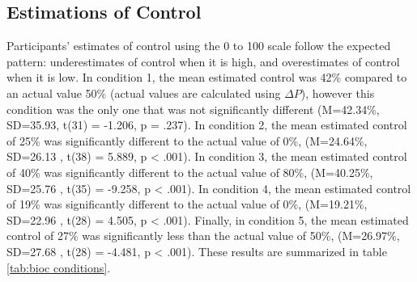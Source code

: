 \documentclass[USenglish,letterpaper,12pt,extrafontsizes,oneside,onecolumn,final]{memoir}
\begin{document}
\subsection{Estimations of Control}

Participants' estimates of control using the 0 to 100 scale follow the expected pattern: underestimates of control when it is high, and overestimates of control when it is low.  In condition 1, the mean estimated control was 42\% compared to an actual value 50\% (actual values are calculated using $\Delta P$), however this condition was the only one that was not significantly different (M=42.34\%, SD=35.93, t(31) = -1.206, p = .237).  In condition 2, the mean estimated control of 25\% was significantly different to the actual value of 0\%, (M=24.64\%, SD=26.13 , t(38) = 5.889, p < .001). In condition 3, the mean estimated control of 40\% was significantly different to the actual value of 80\%, (M=40.25\%, SD=25.76 , t(35) = -9.258, p < .001). In condition 4, the mean estimated control of 19\% was significantly different to the actual value of 0\%, (M=19.21\%, SD=22.96 , t(28) = 4.505, p < .001).  Finally, in condition 5, the mean estimated control of 27\% was significantly less than the actual value of 50\%, (M=26.97\%, SD=27.68 , t(28) = -4.481, p < .001). These results are summarized in table \ref{tab:bioc conditions}.
\end{document}
